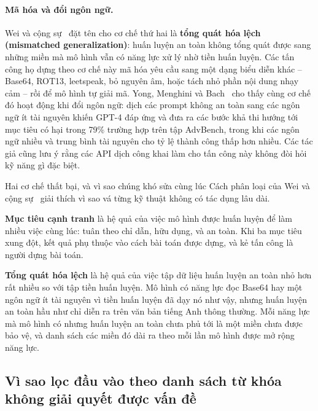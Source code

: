 \paragraph{Mã hóa và đổi ngôn ngữ.} Wei và cộng sự~\cite{wei2023jailbroken} đặt tên cho cơ chế thứ hai là \textbf{tổng quát hóa lệch (mismatched generalization)}: huấn luyện an toàn không tổng quát được sang những miền mà mô hình vẫn có năng lực xử lý nhờ tiền huấn luyện. Các tấn công họ dựng theo cơ chế này mã hóa yêu cầu sang một dạng biểu diễn khác -- Base64, ROT13, leetspeak, bỏ nguyên âm, hoặc tách nhỏ phần nội dung nhạy cảm -- rồi để mô hình tự giải mã. Yong, Menghini và Bach~\cite{yong2023lowresource} cho thấy cùng cơ chế đó hoạt động khi đổi ngôn ngữ: dịch các prompt không an toàn sang các ngôn ngữ ít tài nguyên khiến GPT-4 đáp ứng và đưa ra các bước khả thi hướng tới mục tiêu có hại trong 79\% trường hợp trên tập AdvBench, trong khi các ngôn ngữ nhiều và trung bình tài nguyên cho tỷ lệ thành công thấp hơn nhiều. Các tác giả cũng lưu ý rằng các API dịch công khai làm cho tấn công này không đòi hỏi kỹ năng gì đặc biệt.

\begin{deepdive}{Hai cơ chế thất bại, và vì sao chúng khó sửa cùng lúc}
Cách phân loại của Wei và cộng sự~\cite{wei2023jailbroken} giải thích vì sao vá từng kỹ thuật không có tác dụng lâu dài.

\textbf{Mục tiêu cạnh tranh} là hệ quả của việc mô hình được huấn luyện để làm nhiều việc cùng lúc: tuân theo chỉ dẫn, hữu dụng, và an toàn. Khi ba mục tiêu xung đột, kết quả phụ thuộc vào cách bài toán được dựng, và kẻ tấn công là người dựng bài toán.

\textbf{Tổng quát hóa lệch} là hệ quả của việc tập dữ liệu huấn luyện an toàn nhỏ hơn rất nhiều so với tập tiền huấn luyện. Mô hình có năng lực đọc Base64 hay một ngôn ngữ ít tài nguyên vì tiền huấn luyện đã dạy nó như vậy, nhưng huấn luyện an toàn hầu như chỉ diễn ra trên văn bản tiếng Anh thông thường. Mỗi năng lực mà mô hình có nhưng huấn luyện an toàn chưa phủ tới là một miền chưa được bảo vệ, và danh sách các miền đó dài ra theo mỗi lần mô hình được mở rộng năng lực.
\end{deepdive}

\subsection{Vì sao lọc đầu vào theo danh sách từ khóa không giải quyết được vấn đề}
\label{ssec:keyword_filter_limits}

